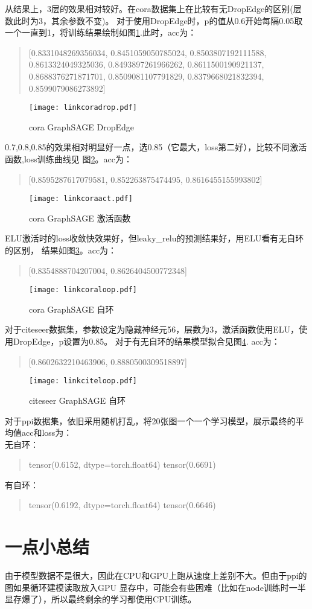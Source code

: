 \documentclass[a4paper,AutoFakeBold,AutoFakeSlant]{ctexart}
\begin{document}
从结果上，3层的效果相对较好。在cora数据集上在比较有无DropEdge的区别(层数此时为3，其余参数不变)。
对于使用DropEdge时，p的值从0.6开始每隔0.05取一个一直到1，将训练结果绘制如图\ref{f12}.此时，acc为：
\begin{quote}
  [0.8331048269356034,
 0.8451059050785024,
 0.8503807192111588,
 0.8613324049325036,
 0.8493897261966262,
 0.8611500190921137,
 0.8688376271871701,
 0.8509081107791829,
 0.8379668021832394,
 0.8599079086273892]
\end{quote}
\begin{figure}[htbp]
  \centering
  \texttt{[image: linkcoradrop.pdf]}
  \caption{cora GraphSAGE DropEdge}
  \label{f12}
\end{figure}

0.7,0.8,0.85的效果相对明显好一点，选0.85（它最大，loss第二好），比较不同激活函数,loss训练曲线见
图\ref{f13}。acc为：
\begin{quote}
  [0.8595287617079581, 0.852263875474495, 0.8616455155993802]
\end{quote}
\begin{figure}[htbp]
  \centering
  \texttt{[image: linkcoraact.pdf]}
  \caption{cora GraphSAGE 激活函数}
  \label{f13}
\end{figure}

ELU激活时的loss收敛快效果好，但leaky\_relu的预测结果好，用ELU看有无自环的区别，
结果如图\ref{f14}。acc为：
\begin{quote}
  [0.8354888704207004, 0.8626404500772348]
\end{quote}
\begin{figure}[htbp]
  \centering
  \texttt{[image: linkcoraloop.pdf]}
  \caption{cora GraphSAGE 自环}
  \label{f14}
\end{figure}

对于citeseer数据集，参数设定为隐藏神经元56，层数为3，激活函数使用ELU，使用DropEdge，p设置为0.85。
对于有无自环的结果模型拟合见图\ref{f15}. acc为：
\begin{quote}
  [0.8602632210463906, 0.8880500309518897]
\end{quote}
\begin{figure}[htbp]
  \centering
  \texttt{[image: linkciteloop.pdf]}
  \caption{citeseer GraphSAGE 自环}
  \label{f15}
\end{figure}

对于ppi数据集，依旧采用随机打乱，将20张图一个一个学习模型，展示最终的平均值acc和loss为：\\
无自环：
\begin{quote}
  tensor(0.6152, dtype=torch.float64) tensor(0.6691)
\end{quote}
有自环：
\begin{quote}
  tensor(0.6192, dtype=torch.float64) tensor(0.6646)
\end{quote}


\section{一点小总结}
由于模型数据不是很大，因此在CPU和GPU上跑从速度上差别不大。但由于ppi的图如果循环建模读取放入GPU
显存中，可能会有些困难（比如在node训练时一半显存爆了），所以最终剩余的学习都使用CPU训练。


% 
% 
\end{document}

